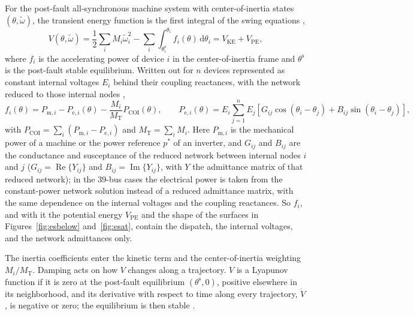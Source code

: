 \documentclass[11pt]{article}
\begin{document}
For the post-fault all-synchronous machine system with center-of-inertia states $(\theta,\tilde\omega)$, the transient energy function is the first integral of the swing equations \cite{sauer1998},
\begin{equation}
V(\theta,\tilde\omega)=\frac12\sum_{i}M_i\tilde\omega_i^2-\sum_{i}\int_{\theta_i^{\mathrm{s}}}^{\theta_i}f_i(\theta)\,\mathrm{d}\theta_i=V_{\mathrm{KE}}+V_{\mathrm{PE}},
\label{eq:tef}
\end{equation}
where $f_i$ is the accelerating power of device $i$ in the center-of-inertia frame and $\theta^{\mathrm{s}}$ is the post-fault stable equilibrium. Written out for $n$ devices represented as constant internal voltages $E_i$ behind their coupling reactances, with the network reduced to those internal nodes \cite{sauer1998},
\begin{equation}
f_i(\theta)=P_{\mathrm{m},i}-P_{\mathrm{e},i}(\theta)-\frac{M_i}{M_{\mathrm{T}}}P_{\mathrm{COI}}(\theta),\qquad
P_{\mathrm{e},i}(\theta)=E_i\sum_{j=1}^{n}E_j\left[G_{ij}\cos(\theta_i-\theta_j)+B_{ij}\sin(\theta_i-\theta_j)\right],
\label{eq:fi}
\end{equation}
with $P_{\mathrm{COI}}=\sum_i(P_{\mathrm{m},i}-P_{\mathrm{e},i})$ and $M_{\mathrm{T}}=\sum_i M_i$. Here $P_{\mathrm{m},i}$ is the mechanical power of a machine or the power reference $p^{*}$ of an inverter, and $G_{ij}$ and $B_{ij}$ are the conductance and susceptance of the reduced network between internal nodes $i$ and $j$ ($G_{ij}=\operatorname{Re}\{Y_{ij}\}$ and $B_{ij}=\operatorname{Im}\{Y_{ij}\}$, with $Y$ the admittance matrix of that reduced network); in the 39-bus cases the electrical power is taken from the constant-power network solution instead of a reduced admittance matrix, with the same dependence on the internal voltages and the coupling reactances. So $f_i$, and with it the potential energy $V_{\mathrm{PE}}$ and the shape of the surfaces in Figures~\ref{fig:esbelow} and~\ref{fig:esat}, contain the dispatch, the internal voltages, and the network admittances only. 

The inertia coefficients enter the kinetic term and the center-of-inertia weighting $M_i/M_{\mathrm{T}}$. Damping acts on how $V$ changes along a trajectory. $V$ is a Lyapunov function if it is zero at the post-fault equilibrium $(\theta^{\mathrm{s}},0)$, positive elsewhere in its neighborhood, and its derivative with respect to time along every trajectory, $\dot V$, is negative or zero; the equilibrium is then stable \cite{khalil2002}. 
\end{document}
